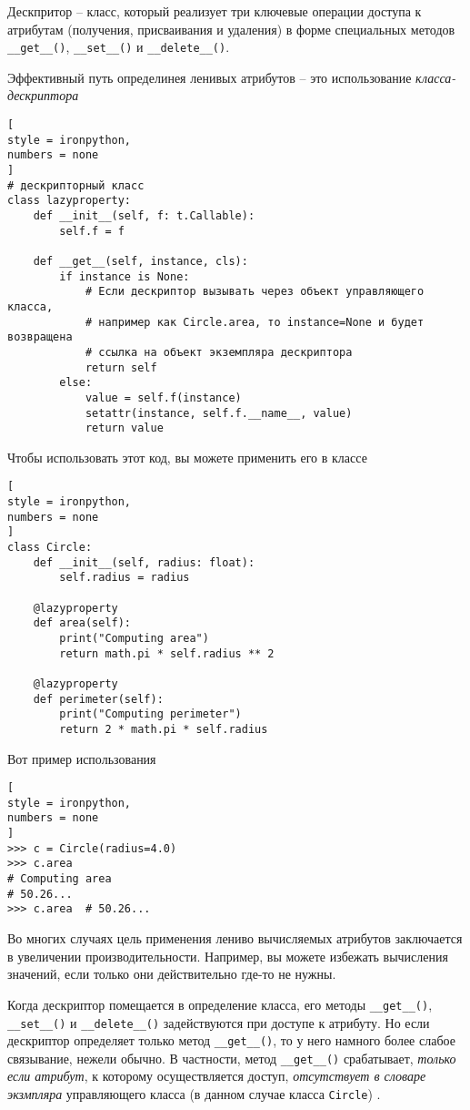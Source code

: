 \documentclass[%
	11pt,
	a4paper,
	utf8,
		]{article}
\begin{document}
Дескпритор -- класс, который реализует три ключевые операции доступа к атрибутам (получения, присваивания и удаления) в форме специальных методов \verb|__get__()|, \verb|__set__()| и \verb|__delete__()|.

Эффективный путь определинея ленивых атрибутов -- это использование \emph{класса-дескриптора} \cite[]{beazley:python_cookbook-2019}
\begin{lstlisting}[
style = ironpython,
numbers = none
]
# дескрипторный класс
class lazyproperty:
    def __init__(self, f: t.Callable):
        self.f = f
        
    def __get__(self, instance, cls):
        if instance is None:
            # Если дескриптор вызывать через объект управляющего класса,
            # например как Circle.area, то instance=None и будет возвращена
            # ссылка на объект экземпляра дескриптора
            return self  
        else:
            value = self.f(instance)
            setattr(instance, self.f.__name__, value)
            return value
\end{lstlisting}

Чтобы использовать этот код, вы можете применить его в классе
\begin{lstlisting}[
style = ironpython,
numbers = none
]
class Circle:
    def __init__(self, radius: float):
        self.radius = radius
        
    @lazyproperty
    def area(self):
        print("Computing area")
        return math.pi * self.radius ** 2
    
    @lazyproperty
    def perimeter(self):
        print("Computing perimeter")
        return 2 * math.pi * self.radius
\end{lstlisting}

Вот пример использования
\begin{lstlisting}[
style = ironpython,
numbers = none
]
>>> c = Circle(radius=4.0)
>>> c.area
# Computing area
# 50.26...
>>> c.area  # 50.26...
\end{lstlisting}

Во многих случаях цель применения лениво вычисляемых атрибутов заключается в увеличении производительности. Например, вы можете избежать вычисления значений, если только они действительно где-то не нужны.

Когда дескриптор помещается в определение класса, его методы \verb|__get__()|, \verb|__set__()| и \verb|__delete__()| задействуются при доступе к атрибуту. Но если дескриптор определяет только метод \verb|__get__()|, то у него намного более слабое связывание, нежели обычно. В частности, метод \verb|__get__()| срабатывает, \emph{только если атрибут}, к которому осуществляется доступ, \emph{отсутствует в словаре экзмпляра} управляющего класса (в данном случае класса \texttt{Circle}) \cite[]{beazley:python_cookbook-2019}.
\end{document}
